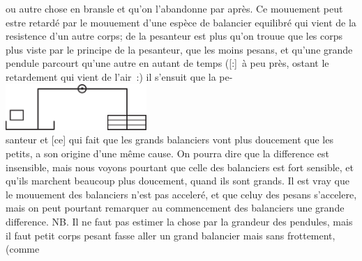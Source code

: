 ou autre chose en bransle et qu'on l'abandonne par apr\`{e}s.
Ce mouuement peut estre retard\'{e} par le mouuement d'une esp\`{e}ce de balancier equilibr\'{e} qui vient de la resistence\protect{} d'un autre corps;
de la pesanteur est plus
qu'on trouue que les corps plus
viste par le principe de la pesanteur, que les moins pesans, et qu'une grande pendule\protect{} parcourt
qu'une autre en autant de temps
([:]~\`{a} peu pr\`{e}s, ostant le retardement qui vient de l'air~:)
il s'ensuit que la pe-
\pend
\vspace{2em}
\pstart
\noindent
\centering
 \includegraphics[trim = 0mm -6mm 0mm 0mm, clip, width=0.4\textwidth]{images/lh0350911_006v-d1.pdf}\\
    \pend
\newpage
\count{}
\count{}
\pstart
\noindent
santeur et [ce] qui fait que les grands balanciers vont plus doucement que les petits, a son origine d'une m\^{e}me cause.
On pourra dire que la difference est insensible, mais nous voyons pourtant que celle des balanciers est fort sensible, et qu'ils marchent beaucoup plus doucement, quand ils sont grands.
Il est vray que le mouuement des balanciers n'est pas acceler\'{e}, et que celuy des pesans s'accelere, mais on peut pourtant remarquer au commencement des balanciers une grande difference.
NB. Il ne faut pas estimer la chose par la grandeur des pendules, mais il faut
petit corps pesant fasse aller un grand balancier mais sans frottement, (comme
